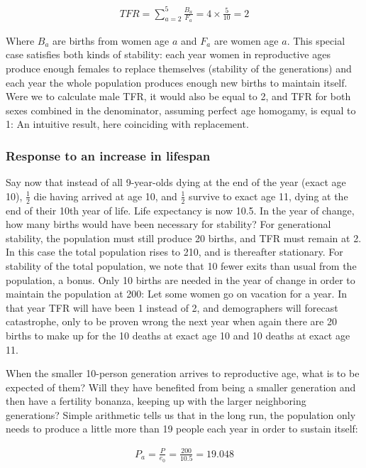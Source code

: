 \documentclass[reqno,12pt,oneside,a4paper]{report} %
\theoremstyle{plain}
\theoremstyle{definition}
\theoremstyle{remark}
\numberwithin{theorem}{chapter}     %
\begin{document}
\begin{align}
TFR = \sum_{a=2}^{5}\frac{B_a}{F_a} = 4 \times \frac{5}{10} = 2
\end{align}

Where $B_a$ are births from women age $a$ and $F_a$ are women age $a$. This special case satisfies both kinds of stability: each year women in reproductive ages produce enough females to replace themselves (stability of the generations) and each year the whole population produces enough new births to maintain itself. Were we to calculate male TFR, it would also be equal to 2, and TFR for both sexes combined in the denominator, assuming perfect age homogamy, is equal to 1: An intuitive result, here coinciding with replacement.

		\subsubsection{Response to an increase in lifespan}

Say now that instead of all 9-year-olds dying at the end of the year (exact age 10), $\frac{1}{2}$ die having arrived at age 10, and $\frac{1}{2}$ survive to exact age 11, dying at the end of their 10th year of life. Life expectancy is now 10.5. In the year of change, how many births would have been necessary for stability? For generational stability, the population must still produce 20 births, and TFR must remain at 2. In this case the total population rises to 210, and is thereafter stationary. For stability of the total population, we note that 10 fewer exits than usual from the population, a bonus. Only 10 births are needed in the year of change in order to maintain the population at 200: Let some women go on vacation for a year. In that year TFR will have been 1 instead of 2, and demographers will forecast catastrophe, only to be proven wrong the next year when again there are 20 births to make up for the 10 deaths at exact age 10 and 10 deaths at exact age 11.

When the smaller 10-person generation arrives to reproductive age, what is to be expected of them? Will they have benefited from being a smaller generation and then have a fertility bonanza, keeping up with the larger neighboring generations? Simple arithmetic tells us that in the long run, the population only needs to produce a little more than 19 people each year in order to sustain itself:

\begin{align}
P_a = \frac{P}{e_0} = \frac{200}{10.5} = 19.048
\end{align}
 
\end{document}

